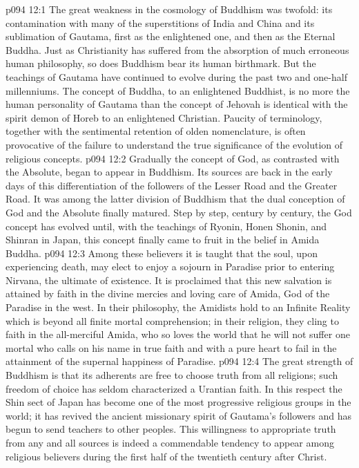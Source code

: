 \vs p094 12:1 The great weakness in the cosmology of Buddhism was twofold: its contamination with many of the superstitions of India and China and its sublimation of Gautama, first as the enlightened one, and then as the Eternal Buddha. Just as Christianity has suffered from the absorption of much erroneous human philosophy, so does Buddhism bear its human birthmark. But the teachings of Gautama have continued to evolve during the past two and one\hyp{}half millenniums. The concept of Buddha, to an enlightened Buddhist, is no more the human personality of Gautama than the concept of Jehovah is identical with the spirit demon of Horeb to an enlightened Christian. Paucity of terminology, together with the sentimental retention of olden nomenclature, is often provocative of the failure to understand the true significance of the evolution of religious concepts.\plusone
\pc \vs p094 12:2 Gradually the concept of God, as contrasted with the Absolute, began to appear in Buddhism. Its sources are back in the early days of this differentiation of the followers of the Lesser Road and the Greater Road. It was among the latter division of Buddhism that the dual conception of God and the Absolute finally matured. Step by step, century by century, the God concept has evolved until, with the teachings of Ryonin, Honen Shonin, and Shinran in Japan, this concept finally came to fruit in the belief in Amida Buddha.
\vs p094 12:3 Among these believers it is taught that the soul, upon experiencing death, may elect to enjoy a sojourn in Paradise prior to entering Nirvana, the ultimate of existence. It is proclaimed that this new salvation is attained by faith in the divine mercies and loving care of Amida, God of the Paradise in the west. In their philosophy, the Amidists hold to an Infinite Reality which is beyond all finite mortal comprehension; in their religion, they cling to faith in the all\hyp{}merciful Amida, who so loves the world that he will not suffer one mortal who calls on his name in true faith and with a pure heart to fail in the attainment of the supernal happiness of Paradise.
\vs p094 12:4 The great strength of Buddhism is that its adherents are free to choose truth from all religions; such freedom of choice has seldom characterized a Urantian faith. In this respect the Shin sect of Japan has become one of the most progressive religious groups in the world; it has revived the ancient missionary spirit of Gautama’s followers and has begun to send teachers to other peoples. This willingness to appropriate truth from any and all sources is indeed a commendable tendency to appear among religious believers during the first half of the twentieth century after Christ.
